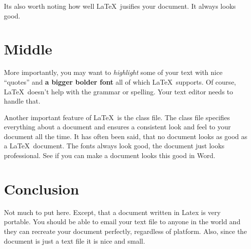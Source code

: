 \documentclass[a4paper,12pt,twocolumn]{article}
\begin{document}
Its also worth noting how well \LaTeX\ jusifies your document.  It always looks good.

\section{Middle}
More importantly, you may want to \textit{highlight} some of your text with nice ``quotes'' and {\Large \textbf{a bigger bolder font}} all of which \LaTeX\ supports.  Of course, \LaTeX\ doesn't help with the grammar or spelling.  Your text editor needs to handle that.

Another important feature of \LaTeX\ is the class file.  The class file specifies everything about a document and ensures a consistent look and feel to your document all the time.  It has often been said, that no document looks as good as a \LaTeX\ document.  The fonts always look good, the document just looks professional.  See if you can make a document looks this good in Word.

\section{Conclusion}
Not much to put here.  Except, that a document written in Latex is very portable.  You should be able to email your text file to anyone in the world and they can recreate your document perfectly, regardless of platform.  Also, since the document is just a text file it is nice and small.
\end{document}
